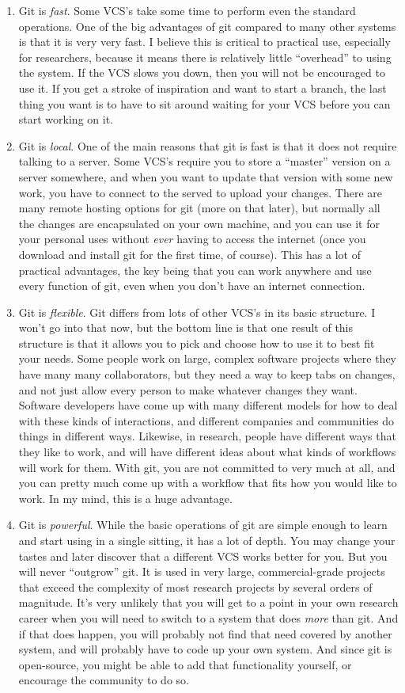 \documentclass[11pt]{article}
\begin{document}
\begin{enumerate}
\item Git is \emph{fast}.  Some VCS's take some time to perform even the standard operations. One of the big advantages of git compared to many other systems is that it is very very fast. I believe this is critical to practical use, especially for researchers, because it means there is relatively little ``overhead'' to using the system.  If the VCS slows you down, then you will not be encouraged to use it. If you get a stroke of inspiration and want to start a branch, the last thing you want is to have to sit around waiting for your VCS before you can start working on it.
\item Git is \emph{local}. One of the main reasons that git is fast is that it does not require talking to a server. Some VCS's require you to store a ``master'' version on a server somewhere, and when you want to update that version with some new work, you have to connect to the served to upload your changes. There are many remote hosting options for git (more on that later), but normally all the changes are encapsulated on your own machine, and you can use it for your personal uses without \emph{ever} having to access the internet (once you download and install git for the first time, of course). This has a lot of practical advantages, the key being that you can work anywhere and use every function of git, even when you don't have an internet connection.
\item Git is \emph{flexible}. Git differs from lots of other VCS's in its basic structure. I won't go into that now, but the bottom line is that one result of this structure is that it allows you to pick and choose how to use it to best fit your needs. Some people work on large, complex software projects where they have many many collaborators, but they need a way to keep tabs on changes, and not just allow every person to make whatever changes they want. Software developers have come up with many different models for how to deal with these kinds of interactions, and different companies and communities do things in different ways. Likewise, in research, people have different ways that they like to work, and will have different ideas about what kinds of workflows will work for them.  With git, you are not committed to very much at all, and you can pretty much come up with a workflow that fits how you would like to work. In my mind, this is a huge advantage.
\item Git is \emph{powerful}. While the basic operations of git are simple enough to learn and start using in a single sitting, it has a lot of depth. You may change your tastes and later discover that a different VCS works better for you. But you will never ``outgrow'' git. It is used in very large, commercial-grade projects that exceed the complexity of most research projects by several orders of magnitude. It's very unlikely that you will get to a point in your own research career when you will need to switch to a system that does \emph{more} than git.  And if that does happen, you will probably not find that need covered by another system, and will probably have to code up your own system. And since git is open-source, you might be able to add that functionality yourself, or encourage the community to do so.

\end{enumerate}
\end{document}
